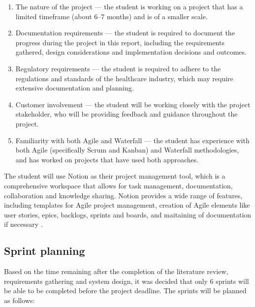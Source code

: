 \begin{enumerate}
    \item The nature of the project --- the student is working on a project that has a limited timeframe (about 6--7 months) and is of a smaller scale. 
    \item Documentation requirements --- the student is required to document the progress during the project in this report, including the requirements gathered, design considerations and implementation decisions and outcomes. 
    \item Regulatory requirements --- the student is required to adhere to the regulations and standards of the healthcare industry, which may require extensive documentation and planning.
    \item Customer involvement --- the student will be working closely with the project stakeholder, who will be providing feedback and guidance throughout the project.
    \item Familiarity with both Agile and Waterfall --- the student has experience with both Agile (specifically Scrum and Kanban) and Waterfall methodologies, and has worked on projects that have used both approaches.
\end{enumerate}

The student will use Notion as their project management tool, which is a comprehensive workspace that allows for task management, documentation, collaboration and knowledge sharing. Notion provides a wide range of features, including templates for Agile project management, creation of Agile elements like user stories, epics, backlogs, sprints and boards, and maitaining of documentation if necessary \parencite{notion}. 

\subsection{Sprint planning}

Based on the time remaining after the completion of the literature review, requirements gathering and system design, it was decided that only 6 sprints will be able to be completed before the project deadline. The sprints will be planned as follows:

